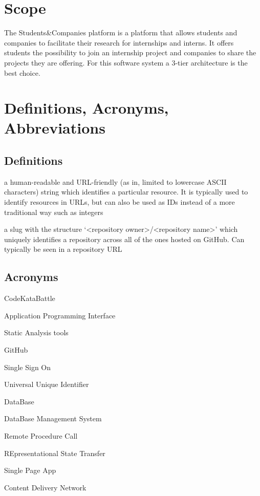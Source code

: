 \section{Scope}
The Students\&Companies platform is a platform that allows students and companies to facilitate their research for internships and interns. It offers students the possibility to join an internship project and companies to share the projects they are offering. 
For this software system a 3-tier architecture is the best choice.  

\section{Definitions, Acronyms, Abbreviations}

\subsection{Definitions}
\begin{description}[leftmargin=0pt]
    \item[Slug:] a human-readable and URL-friendly (as in, limited to lowercase ASCII characters) string which
          identifies a particular resource. It is typically used to identify resources in URLs, but can also be used
          as IDs instead of a more traditional way such as integers
    \item[GitHub Repository Slug:] a slug with the structure `<repository owner>/<repository name>' which uniquely
          identifies a repository across all of the ones hosted on GitHub. Can typically be seen in a repository URL
\end{description}

\subsection{Acronyms}
\begin{description}[leftmargin=0pt]
    \item[CKB:] CodeKataBattle
    \item[API:] Application Programming Interface
    \item[SAT:] Static Analysis tools
    \item[GH:] GitHub
    \item[SSO:] Single Sign On
    \item[UUID:] Universal Unique Identifier
    \item[DB:] DataBase
    \item[DBMS:] DataBase Management System
    \item[RPC:] Remote Procedure Call
    \item[REST:] REpresentational State Transfer
    \item[SPA:] Single Page App
    \item[CDN:] Content Delivery Network
\end{description}

